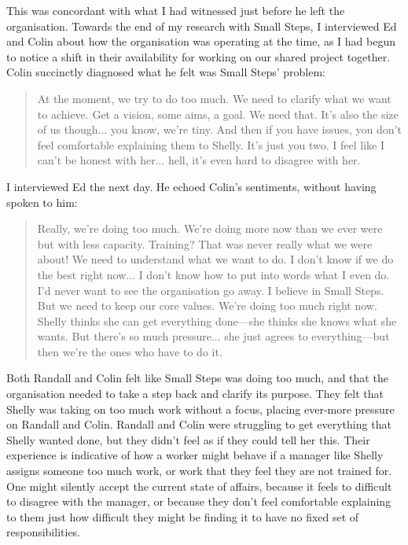 This was concordant with what I had witnessed just before he left the organisation. Towards the end of my research with Small Steps, I interviewed Ed and Colin about how the organisation was operating at the time, as I had begun to notice a shift in their availability for working on our shared project together. Colin succinctly diagnosed what he felt was Small Steps’ problem:
\begin{quote}
At the moment, we try to do too much. We need to clarify what we want to achieve. Get a vision, some aims, a goal. We need that. It's also the size of us though... you know, we're tiny. And then if you have issues, you don't feel comfortable explaining them to Shelly. It's just you two. I feel like I can't be honest with her... hell, it's even hard to disagree with her.
\end{quote}
I interviewed Ed the next day. He echoed Colin’s sentiments, without having spoken to him:
\begin{quote}
Really, we're doing too much. We're doing more now than we ever were but with less capacity. Training? That was never really what we were about! We need to understand what we want to do. I don't know if we do the best right now... I don't know how to put into words what I even do. I'd never want to see the organisation go away. I believe in Small Steps. But we need to keep our core values. We're doing too much right now. Shelly thinks she can get everything done—she thinks she knows what she wants. But there's so much pressure... she just agrees to everything—but then we're the ones who have to do it.
\end{quote}
Both Randall and Colin felt like Small Steps was doing too much, and that the organisation needed to take a step back and clarify its purpose. They felt that Shelly was taking on too much work without a focus, placing ever-more pressure on Randall and Colin. Randall and Colin were struggling to get everything that Shelly wanted done, but they didn't feel as if they could tell her this. Their experience is indicative of how a worker might behave if a manager like Shelly assigns someone too much work, or work that they feel they are not trained for. One might silently accept the current state of affairs, because it feels to difficult to disagree with the manager, or because they don't feel comfortable explaining to them just how difficult they might be finding it to have no fixed set of responsibilities.  

